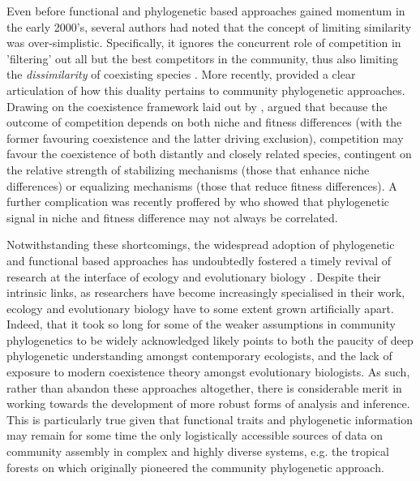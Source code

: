 Even before functional and phylogenetic based approaches gained momentum in the early 2000's, several authors had noted that the concept of limiting similarity was over-simplistic. Specifically, it ignores the concurrent role of competition in 'filtering' out all but the best competitors in the community, thus also limiting the \textit{dissimilarity} of coexisting species \citep[e.g.][]{Abrams1986, Leibold1998}. More recently, \citet{Mayfield2010} provided a clear articulation of how this duality pertains to community phylogenetic approaches. Drawing on the coexistence framework laid out by \citet{Chesson2000}, \citet{Mayfield2010} argued that because the outcome of competition depends on both niche and fitness differences (with the former favouring coexistence and the latter driving exclusion), competition may favour the coexistence of both distantly and closely related species, contingent on the relative strength of stabilizing mechanisms (those that enhance niche differences) or equalizing mechanisms (those that reduce fitness differences). A further complication was recently proffered by \citet{Godoy2014} who showed that phylogenetic signal in niche and fitness difference may not always be correlated.

Notwithstanding these shortcomings, the widespread adoption of phylogenetic and functional based approaches has undoubtedly fostered a timely revival of research at the interface of ecology and evolutionary biology \citep{Emerson2008, Cavender-Bares2009, Vamosi2009}. Despite their intrinsic links, as researchers have become increasingly specialised in their work, ecology and evolutionary biology have to some extent grown artificially apart. Indeed, that it took so long for some of the weaker assumptions in community phylogenetics to be widely acknowledged likely points to both the paucity of deep phylogenetic understanding amongst contemporary ecologists, and the lack of exposure to modern coexistence theory amongst evolutionary biologists. As such, rather than abandon these approaches altogether, there is considerable merit in working towards the development of more robust forms of analysis and inference. This is particularly true given that functional traits and phylogenetic information may remain for some time the only logistically accessible sources of data on community assembly in complex and highly diverse systems, e.g. the tropical forests on which \citet{Webb2000} originally pioneered the community phylogenetic approach.   

